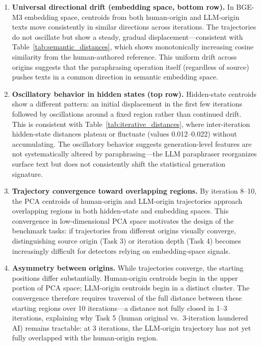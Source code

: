 \begin{enumerate}[nosep]
    \item \textbf{Universal directional drift (embedding space, bottom row).} In BGE-M3 embedding space, centroids from both human-origin and LLM-origin texts move consistently in similar directions across iterations. The trajectories do not oscillate but show a steady, gradual displacement---consistent with Table~\ref{tab:semantic_distances}, which shows monotonically increasing cosine similarity from the human-authored reference. This uniform drift across origins suggests that the paraphrasing operation itself (regardless of source) pushes texts in a common direction in semantic embedding space.

    \item \textbf{Oscillatory behavior in hidden states (top row).} Hidden-state centroids show a different pattern: an initial displacement in the first few iterations followed by oscillations around a fixed region rather than continued drift. This is consistent with Table~\ref{tab:iterative_distances}, where inter-iteration hidden-state distances plateau or fluctuate (values 0.012--0.022) without accumulating. The oscillatory behavior suggests generation-level features are not systematically altered by paraphrasing---the LLM paraphraser reorganizes surface text but does not consistently shift the statistical generation signature.

    \item \textbf{Trajectory convergence toward overlapping regions.} By iteration 8--10, the PCA centroids of human-origin and LLM-origin trajectories approach overlapping regions in both hidden-state and embedding spaces. This convergence in low-dimensional PCA space motivates the design of the benchmark tasks: if trajectories from different origins visually converge, distinguishing source origin (Task 3) or iteration depth (Task 4) becomes increasingly difficult for detectors relying on embedding-space signals.

    \item \textbf{Asymmetry between origins.} While trajectories converge, the starting positions differ substantially. Human-origin centroids begin in the upper portion of PCA space; LLM-origin centroids begin in a distinct cluster. The convergence therefore requires traversal of the full distance between these starting regions over 10 iterations---a distance not fully closed in 1--3 iterations, explaining why Task 5 (human original vs.\ 3-iteration laundered AI) remains tractable: at 3 iterations, the LLM-origin trajectory has not yet fully overlapped with the human-origin region.
\end{enumerate}

